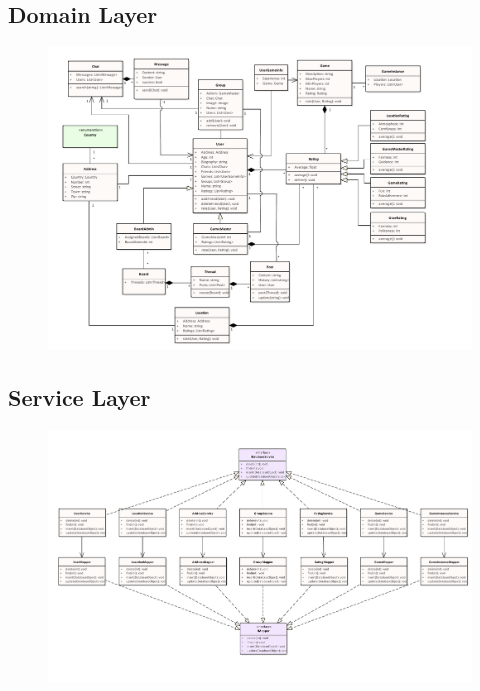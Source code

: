 \subsection*{Domain Layer}
\begin{figure}[h!]
	\centering
	\includegraphics[width = 0.8\linewidth]{docs/5_Klassendiagramme/Marius/DomainLayer.pdf}
	\label{fig:ClassDia_Domain_Layer}
\end{figure}

\vfill

\subsection*{Service Layer}
\begin{figure}[h!]
	\centering
	\includegraphics[width=0.8\linewidth]{docs/5_Klassendiagramme/Marius/ServiceLayer.pdf}
	\label{fig:ClassDia_Service_Layer}
\end{figure}